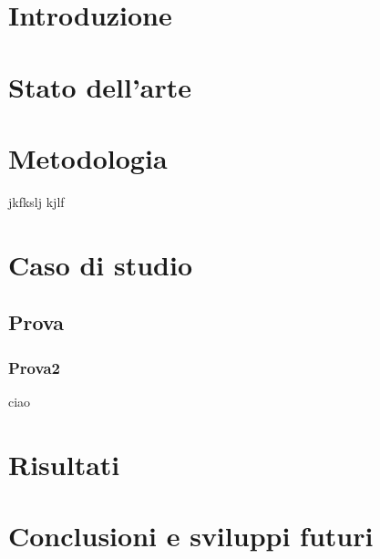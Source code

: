 \documentclass[a4paper,12pt]{report}
\begin{document}
\chapter{Introduzione}

\chapter{Stato dell'arte}

\chapter{Metodologia}
jkfkslj kjlf

\chapter{Caso di studio}

\section{Prova}
\subsection{Prova2}
ciao
\chapter{Risultati}

\chapter{Conclusioni e sviluppi futuri}

\end{document}
